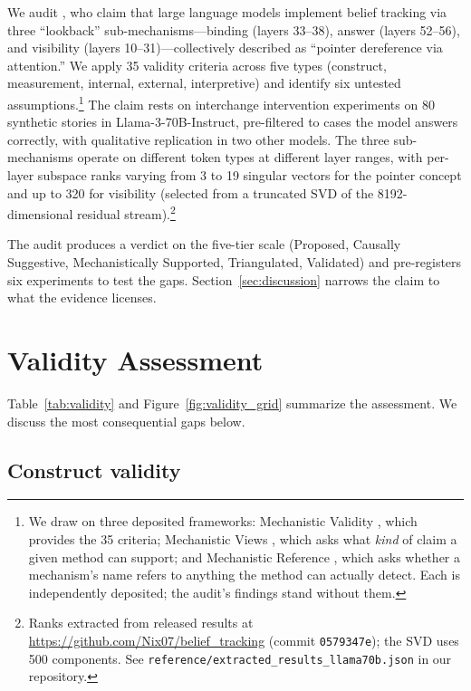 \documentclass[11pt]{article}
\begin{document}
We audit \citet{prakash2025lookback}, who claim that large language models implement belief tracking via three ``lookback'' sub-mechanisms---binding (layers 33--38), answer (layers 52--56), and visibility (layers 10--31)---collectively described as ``pointer dereference via attention.'' We apply 35 validity criteria across five types (construct, measurement, internal, external, interpretive) and identify six untested assumptions.\footnote{We draw on three deposited frameworks: Mechanistic Validity \citep{tower2026mechval}, which provides the 35 criteria; Mechanistic Views \citep{tower2026mechviews}, which asks what \emph{kind} of claim a given method can support; and Mechanistic Reference \citep{tower2026mechref}, which asks whether a mechanism's name refers to anything the method can actually detect. Each is independently deposited; the audit's findings stand without them.} The claim rests on interchange intervention experiments on 80 synthetic stories in Llama-3-70B-Instruct, pre-filtered to cases the model answers correctly, with qualitative replication in two other models. The three sub-mechanisms operate on different token types at different layer ranges, with per-layer subspace ranks varying from 3 to 19 singular vectors for the pointer concept and up to 320 for visibility (selected from a truncated SVD of the 8192-dimensional residual stream).\footnote{Ranks extracted from released results at \url{https://github.com/Nix07/belief_tracking} (commit \texttt{0579347e}); the SVD uses 500 components. See \texttt{reference/extracted\_results\_llama70b.json} in our repository.}

The audit produces a verdict on the five-tier scale (Proposed, Causally Suggestive, Mechanistically Supported, Triangulated, Validated) and pre-registers six experiments to test the gaps. Section~\ref{sec:discussion} narrows the claim to what the evidence licenses.


\section{Validity Assessment}
\label{sec:validity}

Table~\ref{tab:validity} and Figure~\ref{fig:validity_grid} summarize the assessment. We discuss the most consequential gaps below.

\subsection{Construct validity}
\end{document}
